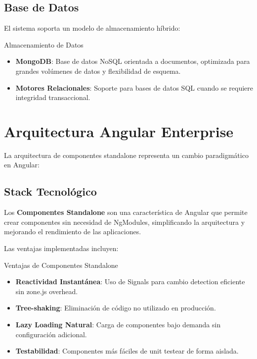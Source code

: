 
\subsection{Base de Datos}

El sistema soporta un modelo de almacenamiento híbrido:

\begin{caja}{Almacenamiento de Datos}
\begin{itemize}
\item \textbf{MongoDB}: Base de datos NoSQL orientada a documentos, optimizada para grandes volúmenes de datos y flexibilidad de esquema.
\item \textbf{Motores Relacionales}: Soporte para bases de datos SQL cuando se requiere integridad transaccional.
\end{itemize}
\end{caja}

\section{Arquitectura Angular Enterprise}

La arquitectura de componentes standalone representa un cambio paradigmático en Angular:

\subsection{Stack Tecnológico}

\begin{definicion}
Los \textbf{Componentes Standalone} son una característica de Angular que permite crear componentes sin necesidad de NgModules, simplificando la arquitectura y mejorando el rendimiento de las aplicaciones.
\end{definicion}


Las ventajas implementadas incluyen:

\begin{caja}{Ventajas de Componentes Standalone}
\begin{itemize}
\item \textbf{Reactividad Instantánea}: Uso de Signals para cambio detection eficiente sin zone.js overhead.
\item \textbf{Tree-shaking}: Eliminación de código no utilizado en producción.
\item \textbf{Lazy Loading Natural}: Carga de componentes bajo demanda sin configuración adicional.
\item \textbf{Testabilidad}: Componentes más fáciles de unit testear de forma aislada.
\end{itemize}
\end{caja}

